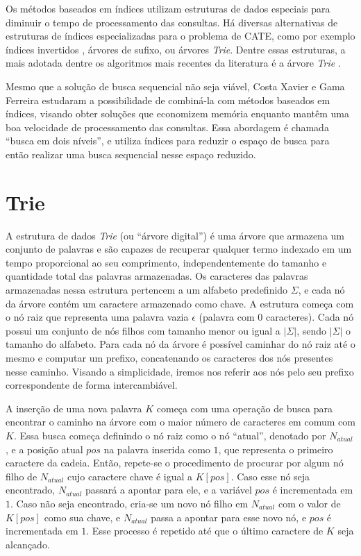 Os métodos baseados em índices utilizam estruturas de dados especiais para diminuir o tempo de processamento das consultas. Há diversas alternativas de estruturas de índices especializadas para o problema de CATE, como por exemplo índices invertidos \citep{baezayates99}, árvores de sufixo, ou árvores \textit{Trie}. Dentre essas estruturas, a mais adotada dentre os algoritmos mais recentes da literatura é a árvore \textit{Trie} \citep{chaudhuri2009extending,ji2009efficient,li2011efficient, xiao2013efficient,deng2016meta, zhou2016beva}.

Mesmo que a solução de busca sequencial não seja viável, Costa Xavier e Gama Ferreira \citep{xavier2019, berg2020} estudaram a possibilidade de combiná-la com métodos baseados em índices, visando obter soluções que economizem memória enquanto mantêm uma boa velocidade de processamento das consultas. Essa abordagem é chamada ``busca em dois níveis'', e utiliza índices para reduzir o espaço de busca para então realizar uma busca sequencial nesse espaço reduzido.

\section{Trie}
\label{sec:trie}

A estrutura de dados \textit{Trie} (ou ``árvore digital'') é uma árvore que armazena um conjunto de palavras e são capazes de recuperar qualquer termo indexado em um tempo proporcional ao seu comprimento, independentemente do tamanho e quantidade total das palavras armazenadas. Os caracteres das palavras armazenadas nessa estrutura pertencem a um alfabeto predefinido $\Sigma$, e cada nó da árvore contém um caractere armazenado como chave. A estrutura começa com o nó raiz que representa uma palavra vazia $\epsilon$ (palavra com $0$ caracteres). Cada nó possui um conjunto de nós filhos com tamanho menor ou igual a $|\Sigma|$, sendo $|\Sigma|$ o tamanho do alfabeto. Para cada nó da árvore é possível caminhar do nó raiz até o mesmo e computar um prefixo, concatenando os caracteres dos nós presentes nesse caminho. Visando a simplicidade, iremos nos referir aos nós pelo seu prefixo correspondente de forma intercambiável.

A inserção de uma nova palavra $K$ começa com uma operação de busca para encontrar o caminho na árvore com o maior número de caracteres em comum com $K$. Essa busca começa definindo o nó raiz como o nó ``atual'', denotado por $N_{atual}$, e a posição atual $pos$ na palavra inserida como $1$, que representa o primeiro caractere da cadeia. Então, repete-se o procedimento de procurar por algum nó filho de $N_{atual}$ cujo caractere chave é igual a $K[pos]$. Caso esse nó seja encontrado, $N_{atual}$ passará a apontar para ele, e a variável $pos$ é incrementada em $1$. Caso não seja encontrado, cria-se um novo nó filho em $N_{atual}$ com o valor de $K[pos]$ como sua chave, e $N_{atual}$ passa a apontar para esse novo nó, e $pos$ é incrementada em $1$. Esse processo é repetido até que o último caractere de $K$ seja alcançado.

